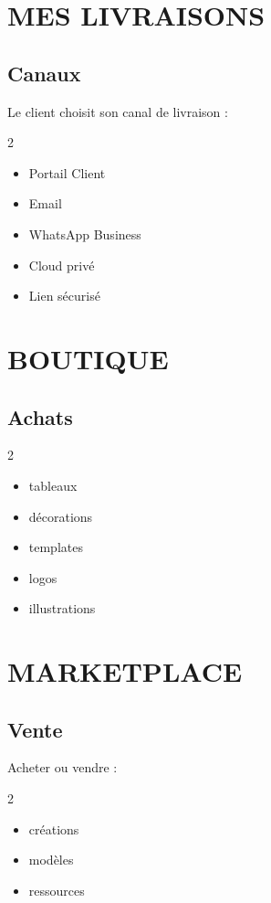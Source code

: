 \documentclass[12pt,a4paper,oneside]{book}
\begin{document}
\chapter{MES LIVRAISONS}

\section{Canaux}
Le client choisit son canal de livraison :
\begin{multicols}{2}
\begin{itemize}
\item Portail Client
\item Email
\item WhatsApp Business
\item Cloud privé
\item Lien sécurisé
\end{itemize}
\end{multicols}

\chapter{BOUTIQUE}

\section{Achats}
\begin{multicols}{2}
\begin{itemize}
\item tableaux
\item décorations
\item templates
\item logos
\item illustrations
\end{itemize}
\end{multicols}

\chapter{MARKETPLACE}

\section{Vente}
Acheter ou vendre :
\begin{multicols}{2}
\begin{itemize}
\item créations
\item modèles
\item ressources
\end{itemize}
\end{multicols}
\end{document}
